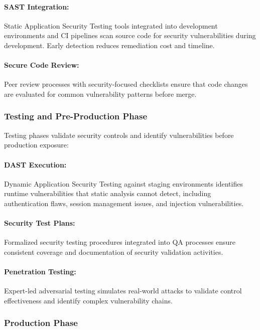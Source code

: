 \documentclass[11pt,letterpaper]{article}
\begin{document}
\paragraph{SAST Integration:} Static Application Security Testing tools integrated into development environments and CI pipelines scan source code for security vulnerabilities during development. Early detection reduces remediation cost and timeline.

\paragraph{Secure Code Review:} Peer review processes with security-focused checklists ensure that code changes are evaluated for common vulnerability patterns before merge.

\subsubsection{Testing and Pre-Production Phase}

Testing phases validate security controls and identify vulnerabilities before production exposure:

\paragraph{DAST Execution:} Dynamic Application Security Testing against staging environments identifies runtime vulnerabilities that static analysis cannot detect, including authentication flaws, session management issues, and injection vulnerabilities.

\paragraph{Security Test Plans:} Formalized security testing procedures integrated into QA processes ensure consistent coverage and documentation of security validation activities.

\paragraph{Penetration Testing:} Expert-led adversarial testing simulates real-world attacks to validate control effectiveness and identify complex vulnerability chains.

\subsubsection{Production Phase}
\end{document}
